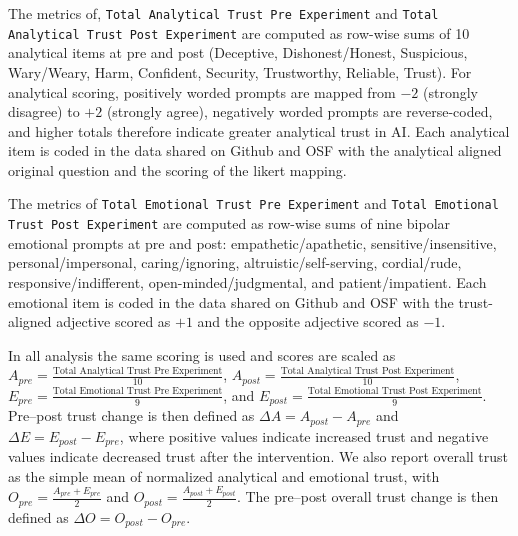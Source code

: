 The metrics of, \texttt{Total Analytical Trust Pre Experiment} and \texttt{Total Analytical Trust Post Experiment} are computed as row-wise sums of 10 analytical items at pre and post (Deceptive, Dishonest/Honest, Suspicious, Wary/Weary, Harm, Confident, Security, Trustworthy, Reliable, Trust).  
For analytical scoring, positively worded prompts are mapped from $-2$ (strongly disagree) to $+2$ (strongly agree), negatively worded prompts are reverse-coded, and higher totals therefore indicate greater analytical trust in AI. Each analytical item is coded in the data shared on Github and OSF with the analytical aligned original question and the scoring of the likert mapping. 

The metrics of \texttt{Total Emotional Trust Pre Experiment} and \texttt{Total Emotional Trust Post Experiment} are computed as row-wise sums of nine bipolar emotional prompts at pre and post: empathetic/apathetic, sensitive/insensitive, personal/impersonal, caring/ignoring, altruistic/self-serving, cordial/rude, responsive/indifferent, open-minded/judgmental, and patient/impatient. Each emotional item is coded in the data shared on Github and OSF with the trust-aligned adjective scored as $+1$ and the opposite adjective scored as $-1$. 

In all analysis the same scoring is used and scores are scaled as $A_{pre}=\frac{\text{Total Analytical Trust Pre Experiment}}{10}$, $A_{post}=\frac{\text{Total Analytical Trust Post Experiment}}{10}$, $E_{pre}=\frac{\text{Total Emotional Trust Pre Experiment}}{9}$, and $E_{post}=\frac{\text{Total Emotional Trust Post Experiment}}{9}$. Pre--post trust change is then defined as $\Delta A = A_{post}-A_{pre}$ and $\Delta E = E_{post}-E_{pre}$, where positive values indicate increased trust and negative values indicate decreased trust after the intervention. We also report overall trust as the simple mean of normalized analytical and emotional trust, with $O_{pre}=\frac{A_{pre}+E_{pre}}{2}$ and $O_{post}=\frac{A_{post}+E_{post}}{2}$. The pre--post overall trust change is then defined as $\Delta O = O_{post}-O_{pre}$.

